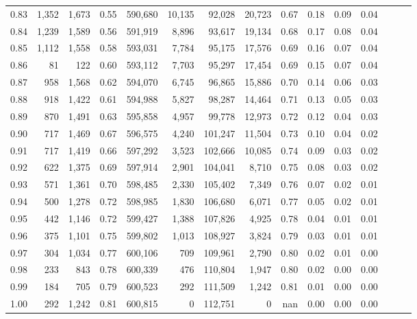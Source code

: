 \begin{tabular}{rrrrrrrrrrrrrrr}
0.83 &   1,352 &  1,673 &  0.55 &  590,680 &   10,135 &   92,028 &   20,723 &  0.67 &  0.18 &  0.09 &      0.04 \\
0.84 &   1,239 &  1,589 &  0.56 &  591,919 &    8,896 &   93,617 &   19,134 &  0.68 &  0.17 &  0.08 &      0.04 \\
0.85 &   1,112 &  1,558 &  0.58 &  593,031 &    7,784 &   95,175 &   17,576 &  0.69 &  0.16 &  0.07 &      0.04 \\
0.86 &      81 &    122 &  0.60 &  593,112 &    7,703 &   95,297 &   17,454 &  0.69 &  0.15 &  0.07 &      0.04 \\
0.87 &     958 &  1,568 &  0.62 &  594,070 &    6,745 &   96,865 &   15,886 &  0.70 &  0.14 &  0.06 &      0.03 \\
0.88 &     918 &  1,422 &  0.61 &  594,988 &    5,827 &   98,287 &   14,464 &  0.71 &  0.13 &  0.05 &      0.03 \\
0.89 &     870 &  1,491 &  0.63 &  595,858 &    4,957 &   99,778 &   12,973 &  0.72 &  0.12 &  0.04 &      0.03 \\
0.90 &     717 &  1,469 &  0.67 &  596,575 &    4,240 &  101,247 &   11,504 &  0.73 &  0.10 &  0.04 &      0.02 \\
0.91 &     717 &  1,419 &  0.66 &  597,292 &    3,523 &  102,666 &   10,085 &  0.74 &  0.09 &  0.03 &      0.02 \\
0.92 &     622 &  1,375 &  0.69 &  597,914 &    2,901 &  104,041 &    8,710 &  0.75 &  0.08 &  0.03 &      0.02 \\
0.93 &     571 &  1,361 &  0.70 &  598,485 &    2,330 &  105,402 &    7,349 &  0.76 &  0.07 &  0.02 &      0.01 \\
0.94 &     500 &  1,278 &  0.72 &  598,985 &    1,830 &  106,680 &    6,071 &  0.77 &  0.05 &  0.02 &      0.01 \\
0.95 &     442 &  1,146 &  0.72 &  599,427 &    1,388 &  107,826 &    4,925 &  0.78 &  0.04 &  0.01 &      0.01 \\
0.96 &     375 &  1,101 &  0.75 &  599,802 &    1,013 &  108,927 &    3,824 &  0.79 &  0.03 &  0.01 &      0.01 \\
0.97 &     304 &  1,034 &  0.77 &  600,106 &      709 &  109,961 &    2,790 &  0.80 &  0.02 &  0.01 &      0.00 \\
0.98 &     233 &    843 &  0.78 &  600,339 &      476 &  110,804 &    1,947 &  0.80 &  0.02 &  0.00 &      0.00 \\
0.99 &     184 &    705 &  0.79 &  600,523 &      292 &  111,509 &    1,242 &  0.81 &  0.01 &  0.00 &      0.00 \\
1.00 &     292 &  1,242 &  0.81 &  600,815 &        0 &  112,751 &        0 &   nan &  0.00 &  0.00 &      0.00 \\
\bottomrule
\end{tabular}
